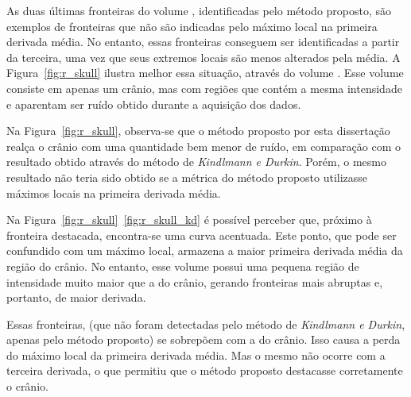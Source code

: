 	As duas últimas fronteiras do volume , identificadas pelo método proposto, são exemplos de fronteiras que não são indicadas pelo máximo local na primeira derivada média. No entanto, essas fronteiras conseguem ser identificadas a partir da terceira, uma vez que seus extremos locais são menos alterados pela média.	A Figura~\ref{fig:r_skull} ilustra melhor essa situação, através do volume . Esse volume consiste em apenas um crânio, mas com regiões que contém a mesma intensidade e aparentam ser ruído obtido durante a aquisição dos dados.
	
	Na Figura~\ref{fig:r_skull}, observa-se que o método proposto por esta dissertação realça o crânio com uma quantidade bem menor de ruído, em comparação com o resultado obtido através do método de \textit{Kindlmann e Durkin}. Porém, o mesmo resultado não teria sido obtido se a métrica do método proposto utilizasse máximos locais na primeira derivada média.
	
	Na Figura~\ref{fig:r_skull}~\ref{fig:r_skull_kd} é possível perceber que, próximo à fronteira destacada, encontra-se uma curva acentuada. Este ponto, que pode ser confundido com um máximo local, armazena a maior primeira derivada média da região do crânio. No entanto, esse volume possui uma pequena região de intensidade muito maior que a do crânio, gerando fronteiras mais abruptas e, portanto, de maior derivada.
	
	Essas fronteiras, (que não foram detectadas pelo método de \textit{Kindlmann e Durkin}, apenas pelo método proposto) se sobrepõem com a do crânio. Isso causa a perda do máximo local da primeira derivada média. Mas o mesmo não ocorre com a terceira derivada, o que permitiu que o método proposto destacasse corretamente o crânio.
	
